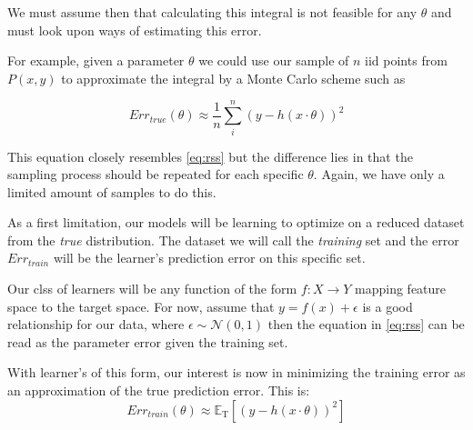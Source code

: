 \documentclass{article}%
\newcommand{\calN}{\mathcal{N}}
\newcommand{\Expect}{{\mathbb{E}}}
\theoremstyle{definition}
\begin{document}
We must assume then that calculating this integral is not feasible for any $\theta$ and must look upon ways of estimating this error.

For example, given a parameter $\theta$ we could use our sample of $n$ iid points from $P(x,y)$ to approximate the integral by a Monte Carlo scheme such as 

\begin{equation} \label{eq:mcarlo-approx}
Err_{true}(\theta)  \approx \frac{1}{n} \sum_i^n ( y - h(x \cdot \theta) )^2
\end{equation}

This equation closely resembles \ref{eq:rss} but the difference lies in that the sampling process should be repeated for each specific $\theta$. Again, we have only a limited amount of samples to do this.

As a first limitation, our models will be learning to optimize on a reduced dataset from the \textit{true} distribution. The dataset we will call the \textit{training} set and the error $Err_{train}$ will be the learner's prediction error on this specific set.



Our clss of learners will be any function of the form $f: X \rightarrow Y$ mapping feature space to the target space. For now, assume that $y  =  f(x)  +  \epsilon $ is a good relationship for our data, where $\epsilon \sim \calN(0,1) $ then the equation in \ref{eq:rss} can be read as the parameter error given the training set.

With learner's of this form, our interest is now in minimizing the training error as an approximation of the true prediction error. This is:
\[
Err_{train}(\theta) \approx \Expect_{ \mathrm{T}}[(y - h(x \cdot \theta) )^2]
\]


\end{document}
